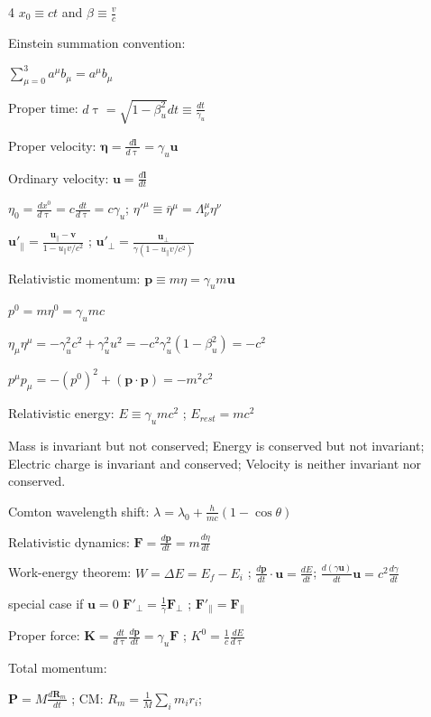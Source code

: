 \documentclass[a4paper,twoside]{article}
\begin{document}
\begin{multicols*}{4}
\(x_0 \equiv ct\) and \(\beta \equiv \frac{v}{c}\)

Einstein summation convention:

\(\sum_{\mu=0}^3 a^\mu b_\mu = a^\mu b_\mu\)

Proper time:
\(d\uptau = \sqrt{1 - \beta_u^2}dt \equiv \frac{dt}{\gamma_u}\)

Proper velocity:
\(\bm \eta = \frac{d\bm l}{d\uptau} = \gamma_u \bm u\) 

Ordinary velocity:
\(\bm u = \frac{d\bm l}{dt}\)

\(\eta_0 = \frac{dx^0}{d\uptau} = c \frac{dt}{d\uptau} = c\gamma_u\);
\(\eta'^\mu \equiv \bar{\eta}^\mu = \Lambda_\nu^\mu \eta^\nu\)

\(\bm u'_\parallel = \frac{\bm u_\parallel-\bm v}{1 - u_\parallel v/c^2}\) ; \(\bm u'_\perp = \frac{\bm u_\perp}{\gamma (1 - u_\parallel v/c^2)}\)

Relativistic momentum:
\(\bm p \equiv  m \eta =  \gamma_u m \bm u\)

\(p^0 = m\eta^0 = \gamma_u mc\)

\(\eta_\mu \eta^\mu = - \gamma_u^2 c^2 + \gamma_u^2 u^2 = -c^2\gamma_u^2(1-\beta_u^2) = -c^2\)

\(p^\mu p_\mu = -(p^0)^2+ (\bm p \cdot \bm p) = -m^2c^2\)



Relativistic energy:
\(E \equiv \gamma_u mc^2\) ;
\(E_{rest}=mc^2\)

Mass is invariant but not conserved;
Energy is conserved but not invariant;
Electric charge is invariant and conserved;
Velocity is neither invariant nor conserved.


Comton wavelength shift:
\(\lambda = \lambda_0 + \frac{h}{mc}(1-\cos \theta)\)

Relativistic dynamics:
\(\bm F = \frac{d\bm p}{dt} = m \frac{d\eta}{dt}\)

Work-energy theorem:
\(W = \Delta E = E_f - E_i\) ; \(\frac{d\bm p}{dt} \cdot \bm u = \frac{dE}{dt}\);
\(\frac{d(\gamma \bm u)}{dt}\bm u = c^2\frac{d\gamma}{dt}\)

special case if \(\bm u = 0\) 
\(\bm F'_{\perp} = \frac{1}{\gamma} \bm F_{\perp}\) ; \(\bm F'_{\parallel} = \bm F_{\parallel}\)

Proper force:
\(\bm K = \frac{dt}{d\uptau} \frac{d\bm p}{dt} = \gamma_u \bm F\) ; \(K^0 = \frac{1}{c} \frac{dE}{d\uptau}\)

Total momentum:

\(\bm P = M \frac{d \bm R_m}{dt}\) ; CM: \(R_m = \frac{1}{M} \sum_i m_i r_i\);


\end{multicols*}
\end{document}

